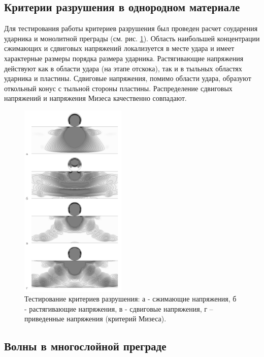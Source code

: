 \clearpage
\newpage

\subsection{Критерии разрушения в однородном материале}

Для тестирования работы критериев разрушения был проведен расчет соударения ударника и монолитной преграды (см. рис. \ref{pic:destruction_test}). Область наибольшей концентрации сжимающих и сдвиговых напряжений локализуется в месте удара и имеет характерные размеры порядка размера ударника. Растягивающие напряжения действуют как в области удара (на этапе отскока), так и в тыльных областях ударника и пластины. Сдвиговые напряжения, помимо области удара, образуют откольный конус с тыльной стороны пластины. Распределение сдвиговых напряжений и напряжения Мизеса качественно совпадают.

\begin{figure}[htp]
\centering
\includegraphics[width=0.45\textwidth]{png/destruction_test.png}
\caption{Тестирование критериев разрушения: а - сжимающие напряжения, б - растягивающие напряжения, в - сдвиговые напряжения, г – приведенные напряжения (критерий Мизеса).}
\label{pic:destruction_test}
\end{figure}

\clearpage
\newpage

\subsection{Волны в многослойной преграде}

